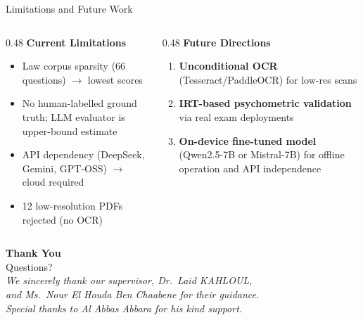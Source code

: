 \documentclass[aspectratio=169]{beamer}
\begin{document}
\begin{frame}{Limitations and Future Work}
  \begin{columns}[T]
    \begin{column}{0.48\textwidth}
      \textbf{Current Limitations}
      \begin{itemize}
        \item Law corpus sparsity (66 questions) $\to$ lowest scores
        \item No human-labelled ground truth; LLM evaluator is upper-bound estimate
        \item API dependency (DeepSeek, Gemini, GPT-OSS) $\to$ cloud required
        \item 12 low-resolution PDFs rejected (no OCR)
      \end{itemize}
    \end{column}
    \begin{column}{0.48\textwidth}
      \textbf{Future Directions}
      \begin{enumerate}
        \item \textbf{Unconditional OCR} (Tesseract/PaddleOCR) for low-res scans
        \item \textbf{IRT-based psychometric validation} via real exam deployments
        \item \textbf{On-device fine-tuned model} (Qwen2.5-7B or Mistral-7B)
              for offline operation and API independence
      \end{enumerate}
    \end{column}
  \end{columns}
\end{frame}

\begin{frame}[plain]
  \begin{center}
    \vspace{1.5cm}
    {\color{white}\Large\bfseries Thank You}\\[12pt]
    {\color{white!80}\large Questions?}\\[20pt]
    \color{white!70}
    \textit{We sincerely thank our supervisor, Dr.\ Laid KAHLOUL,}\\
    \textit{and Ms.\ Nour El Houda Ben Chaabene for their guidance.}\\[4pt]
    \textit{Special thanks to Al Abbas Abbara for his kind support.}
  \end{center}
\end{frame}
\end{document}
